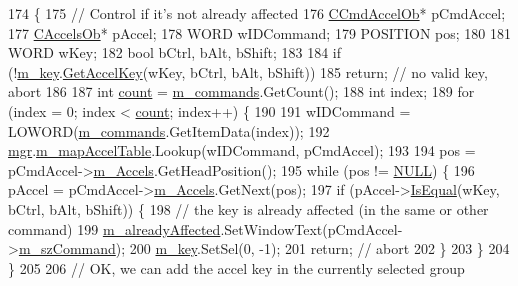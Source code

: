 \begin{DoxyCode}
174 \{
175   \textcolor{comment}{// Control if it's not already affected}
176   \mbox{\hyperlink{class_c_cmd_accel_ob}{CCmdAccelOb}}* pCmdAccel;
177   \mbox{\hyperlink{class_c_accels_ob}{CAccelsOb}}* pAccel;
178   WORD wIDCommand;
179   POSITION pos;
180   
181   WORD wKey;
182   \textcolor{keywordtype}{bool} bCtrl, bAlt, bShift;
183 
184   \textcolor{keywordflow}{if} (!\mbox{\hyperlink{class_accel_editor_af0875f914fdddf5233a951cabd499a4d}{m\_key}}.\mbox{\hyperlink{class_c_keyboard_edit_a920dfccebef5e2260e59003e4959ef9f}{GetAccelKey}}(wKey, bCtrl, bAlt, bShift))
185     \textcolor{keywordflow}{return}; \textcolor{comment}{// no valid key, abort}
186 
187   \textcolor{keywordtype}{int} \mbox{\hyperlink{expr_8cpp_a16ff2d8e15ade4948398b0aeb80124a8}{count}} = \mbox{\hyperlink{class_accel_editor_aba4ea3d3eced08de9fe39e307b5f40fc}{m\_commands}}.GetCount();
188   \textcolor{keywordtype}{int} index;
189   \textcolor{keywordflow}{for} (index = 0; index < \mbox{\hyperlink{expr_8cpp_a16ff2d8e15ade4948398b0aeb80124a8}{count}}; index++) \{
190 
191     wIDCommand = LOWORD(\mbox{\hyperlink{class_accel_editor_aba4ea3d3eced08de9fe39e307b5f40fc}{m\_commands}}.GetItemData(index));
192     \mbox{\hyperlink{class_accel_editor_acb731e2193cb5022a95e83122651f96d}{mgr}}.\mbox{\hyperlink{class_c_accelerator_manager_a16b8d3e9328bc0eeeb048630deff2768}{m\_mapAccelTable}}.Lookup(wIDCommand, pCmdAccel);
193 
194     pos = pCmdAccel->\mbox{\hyperlink{class_c_cmd_accel_ob_a85772f1ea9204af42b8a39a0135dc0f8}{m\_Accels}}.GetHeadPosition();
195     \textcolor{keywordflow}{while} (pos != \mbox{\hyperlink{getopt1_8c_a070d2ce7b6bb7e5c05602aa8c308d0c4}{NULL}}) \{
196       pAccel = pCmdAccel->\mbox{\hyperlink{class_c_cmd_accel_ob_a85772f1ea9204af42b8a39a0135dc0f8}{m\_Accels}}.GetNext(pos);
197       \textcolor{keywordflow}{if} (pAccel->\mbox{\hyperlink{class_c_accels_ob_a32714a4454d398d3d3a68d1705a76bc5}{IsEqual}}(wKey, bCtrl, bAlt, bShift)) \{
198         \textcolor{comment}{// the key is already affected (in the same or other command)}
199         \mbox{\hyperlink{class_accel_editor_ac3d2378be850611ee51689bd34475275}{m\_alreadyAffected}}.SetWindowText(pCmdAccel->\mbox{\hyperlink{class_c_cmd_accel_ob_acbd02cc68d3909b1e39b687e76f45d91}{m\_szCommand}});
200         \mbox{\hyperlink{class_accel_editor_af0875f914fdddf5233a951cabd499a4d}{m\_key}}.SetSel(0, -1);
201         \textcolor{keywordflow}{return}; \textcolor{comment}{// abort}
202       \}
203     \}
204   \}
205 
206   \textcolor{comment}{// OK, we can add the accel key in the currently selected group}

\end{DoxyCode}

